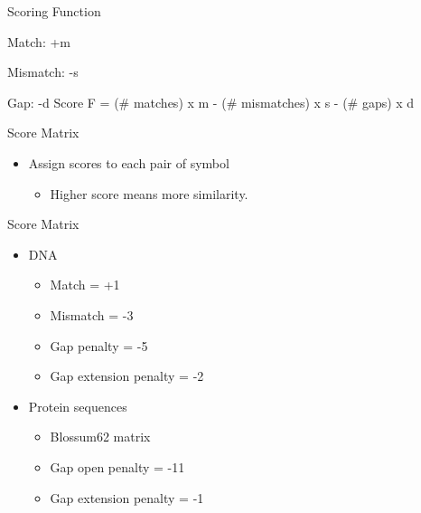 \documentclass{bredelebeamer}
\begin{document}
\begin{frame}{Scoring Function}
    \par Match: \quad+m\linebreak
    \par Mismatch: \quad-s\linebreak
    \par Gap: \quad-d
    \linebreak
    \linebreak
    \linebreak
    Score F = (\# matches) x m - (\# mismatches) x s - (\# gaps) x d
\end{frame}
\begin{frame}{Score Matrix}
   \begin{itemize}
   \item Assign scores to each pair of symbol
\begin{itemize}
 \item   Higher score means more similarity.
   \end{itemize} 
   \end{itemize} 
\end{frame}
\begin{frame}{Score Matrix}
\begin{itemize}
       \item DNA
\begin{itemize}
       \item  Match = +1
        \item  Mismatch = -3
         \item   Gap penalty = -5
          \item  Gap extension penalty = -2

   \end{itemize} 
   \item Protein sequences
\begin{itemize}
 \item Blossum62 matrix
         \item   Gap open penalty = -11
          \item  Gap extension penalty = -1
   \end{itemize} 
   \end{itemize}
\end{frame}
\end{document}
